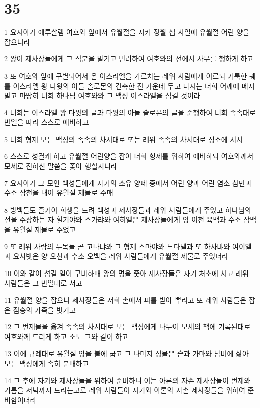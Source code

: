 \chapter{35}

\par 1 요시야가 예루살렘 여호와 앞에서 유월절을 지켜 정월 십 사일에 유월절 어린 양을 잡으니라
\par 2 왕이 제사장들에게 그 직분을 맡기고 면려하여 여호와의 전에서 사무를 행하게 하고
\par 3 또 여호와 앞에 구별되어서 온 이스라엘을 가르치는 레위 사람에게 이르되 거룩한 궤를 이스라엘 왕 다윗의 아들 솔로몬의 건축한 전 가운데 두고 다시는 너희 어깨에 메지 말고 마땅히 너희 하나님 여호와와 그 백성 이스라엘을 섬길 것이라
\par 4 너희는 이스라엘 왕 다윗의 글과 다윗의 아들 솔로몬의 글을 준행하여 너희 족속대로 반열을 따라 스스로 예비하고
\par 5 너희 형제 모든 백성의 족속의 차서대로 또는 레위 족속의 차서대로 성소에 서서
\par 6 스스로 성결케 하고 유월절 어린양을 잡아 너희 형제를 위하여 예비하되 여호와께서 모세로 전하신 말씀을 좇아 행할지니라
\par 7 요시야가 그 모인 백성들에게 자기의 소유 양떼 중에서 어린 양과 어린 염소 삼만과 수소 삼천을 내어 유월절 제물로 주매
\par 8 방백들도 즐거이 희생을 드려 백성과 제사장들과 레위 사람들에게 주었고 하나님의 전을 주장하는 자 힐기야와 스가랴와 여히엘은 제사장들에게 양 이천 육백과 수소 삼백을 유월절 제물로 주었고
\par 9 또 레위 사람의 두목들 곧 고나냐와 그 형제 스마야와 느다넬과 또 하사뱌와 여이엘과 요사밧은 양 오천과 수소 오백을 레위 사람들에게 유월절 제물로 주었더라
\par 10 이와 같이 섬길 일이 구비하매 왕의 명을 좇아 제사장들은 자기 처소에 서고 레위 사람들은 그 반열대로 서고
\par 11 유월절 양을 잡으니 제사장들은 저희 손에서 피를 받아 뿌리고 또 레위 사람들은 잡은 짐승의 가죽을 벗기고
\par 12 그 번제물을 옮겨 족속의 차서대로 모든 백성에게 나누어 모세의 책에 기록된대로 여호와께 드리게 하고 소도 그와 같이 하고
\par 13 이에 규례대로 유월절 양을 불에 굽고 그 나머지 성물은 솥과 가마와 남비에 삶아 모든 백성에게 속히 분배하고
\par 14 그 후에 자기와 제사장들을 위하여 준비하니 이는 아론의 자손 제사장들이 번제와 기름을 저녁까지 드리는고로 레위 사람들이 자기와 아론의 자손 제사장들을 위하여 준비함이더라
